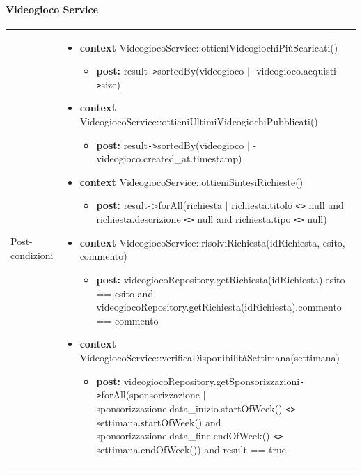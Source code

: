 \paragraph{Videogioco Service}
\small\begin{tabular}{|| l | p{28em} ||} 
	\hline
	Post-condizioni & \begin{itemize}[leftmargin=*]
		\item \textbf{context} VideogiocoService::ottieniVideogiochiPiùScaricati()
		\begin{itemize}
			\item[ ] \textbf{post:} result\verb|->|sortedBy(videogioco $|$ -videogioco.acquisti\verb|->|size)
		\end{itemize}

		\item \textbf{context} VideogiocoService\newline ::ottieniUltimiVideogiochiPubblicati()
		\begin{itemize}
			\item[ ] \textbf{post:} result\verb|->|sortedBy(videogioco $|$ -videogioco.created\_at.timestamp)
		\end{itemize}

		\item \textbf{context} VideogiocoService::ottieniSintesiRichieste()
		\begin{itemize}
			\item[ ] \textbf{post:} result->forAll(richiesta $|$ richiesta.titolo \verb|<>| null and richiesta.descrizione \verb|<>| null and richiesta.tipo \verb|<>| null)
		\end{itemize}

		\item \textbf{context} VideogiocoService::risolviRichiesta(idRichiesta, esito, commento)
		\begin{itemize}
			\item[ ] \textbf{post:} videogiocoRepository.getRichiesta(idRichiesta).esito == esito and videogiocoRepository.getRichiesta(idRichiesta).commento == commento
		\end{itemize}

		\item \textbf{context} VideogiocoService\newline ::verificaDisponibilitàSettimana(settimana)
		\begin{itemize}
			\item[ ] \textbf{post:} videogiocoRepository.getSponsorizzazioni\newline\verb|->|forAll(sponsorizzazione $|$ sponsorizzazione.data\_inizio.startOfWeek() \verb|<>| settimana.startOfWeek() and sponsorizzazione.data\_fine.endOfWeek() \verb|<>| settimana.endOfWeek()) and result == true
		\end{itemize}


\end{itemize}
\end{tabular}
